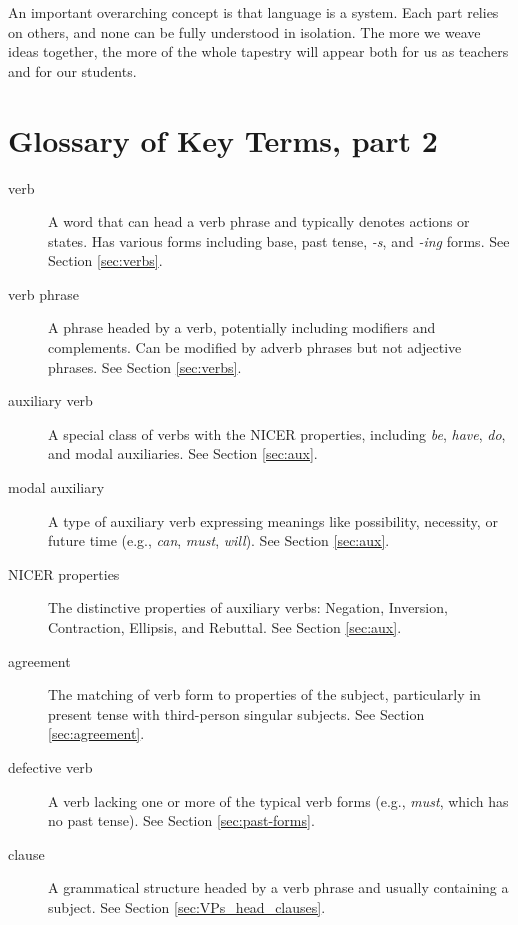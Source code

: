 An important overarching concept is that language is a system. Each part relies on others, and none can be fully understood in isolation. The more we weave ideas together, the more of the whole tapestry will appear both for us as teachers and for our students.

\newpage
\section{Glossary of Key Terms, part 2}
\begin{description}
   \item[verb] A word that can head a verb phrase and typically denotes actions or states. Has various forms including base, past tense, \textit{-s}, and \textit{-ing} forms. See Section \ref{sec:verbs}.
   
   \item[verb phrase] A phrase headed by a verb, potentially including modifiers and complements. Can be modified by adverb phrases but not adjective phrases. See Section \ref{sec:verbs}.
   
   \item[auxiliary verb] A special class of verbs with the NICER properties, including \textit{be}, \textit{have}, \textit{do}, and modal auxiliaries. See Section \ref{sec:aux}.
   
   \item[modal auxiliary] A type of auxiliary verb expressing meanings like possibility, necessity, or future time (e.g., \textit{can}, \textit{must}, \textit{will}). See Section \ref{sec:aux}.
   
   \item[NICER properties] The distinctive properties of auxiliary verbs: Negation, Inversion, Contraction, Ellipsis, and Rebuttal. See Section \ref{sec:aux}.
   
   \item[agreement] The matching of verb form to properties of the subject, particularly in present tense with third-person singular subjects. See Section \ref{sec:agreement}.
   
   \item[defective verb] A verb lacking one or more of the typical verb forms (e.g., \textit{must}, which has no past tense). See Section \ref{sec:past-forms}.
   
   \item[clause] A grammatical structure headed by a verb phrase and usually containing a subject. See Section \ref{sec:VPs_head_clauses}.
\end{description}

